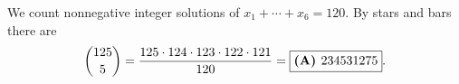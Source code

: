 We count nonnegative integer solutions of $x_1+\cdots+x_6=120$. By stars and bars there are
\[\dbinom{125}{5}=\dfrac{125\cdot124\cdot123\cdot122\cdot121}{120}=\boxed{\textbf{(A) }234531275}.\]
